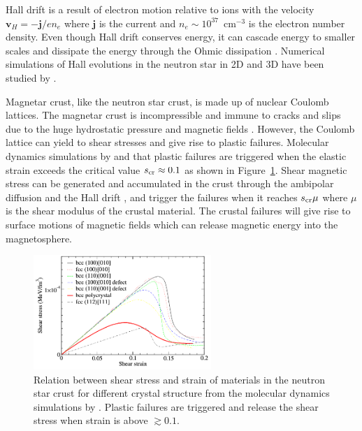 Hall drift is a result of electron motion relative to ions with the velocity $\boldsymbol{v}_H = -\boldsymbol{j}/en_e$ where $\boldsymbol{j}$ is the current and $n_e\sim 10^{37}$~cm$^{-3}$ is the electron number density.
Even though Hall drift conserves energy, it can cascade energy to smaller scales and dissipate the energy through the Ohmic dissipation \citep{1992ApJ...395..250G}.
Numerical simulations of Hall evolutions in the neutron star in 2D and 3D have been studied by \citep{2009A&A...496..207P, 2016PNAS..113.3944G,2018MNRAS.473.2771B}.

Magnetar crust, like the neutron star crust, is made up of nuclear Coulomb lattices.
The magnetar crust is incompressible and immune to cracks and slips due to the huge hydrostatic pressure \citep{2003ApJ...595..342J} and magnetic fields \citep{2012MNRAS.427.1574L}.
However, the Coulomb lattice can yield to shear stresses and give rise to plastic failures.
Molecular dynamics simulations by \citet{2009PhRvL.102s1102H} and \citet{2010MNRAS.407L..54C} that plastic failures are triggered when the elastic strain exceeds the critical value $s_{\rm cr}\approx 0.1$ as shown in Figure~\ref{fig:plastic-md}.
Shear magnetic stress can be generated and accumulated in the crust through the ambipolar diffusion and the Hall drift \citep{1996ApJ...473..322T,2011ApJ...727L..51P}, and trigger the failures when it reaches $s_{\rm cr}\mu$ where $\mu$ is the shear modulus of the crustal material.
The crustal failures will give rise to surface motions of magnetic fields which can release magnetic energy into the magnetosphere.
%
\begin{figure}[h]
  \centering
  \includegraphics[width=0.6\textwidth]{pics/intro/plastic.png}
  \caption[Relation between shear stress and strain of materials in the neutron star crust]{Relation between shear stress and strain of materials in the neutron star crust for different crystal structure from the molecular dynamics simulations by \citet{2009PhRvL.102s1102H}.
  Plastic failures are triggered and release the shear stress when strain is above $\gtrsim 0.1$.}
  \label{fig:plastic-md}
\end{figure}
%

